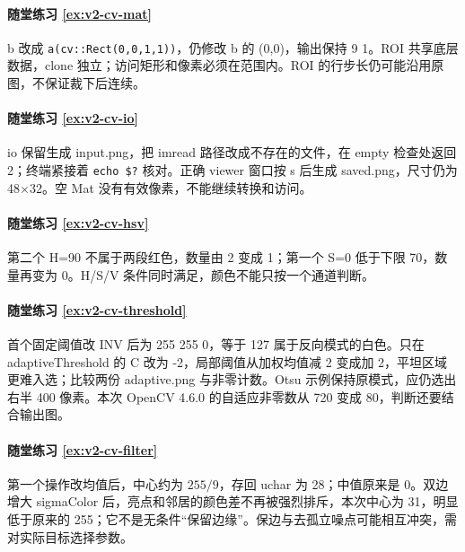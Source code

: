 \paragraph*{随堂练习 \ref{ex:v2-cv-mat}}
\begin{solution}
b 改成 \texttt{a(cv::Rect(0,0,1,1))}，仍修改 b 的 (0,0)，输出保持 9 1。ROI 共享底层数据，clone 独立；访问矩形和像素必须在范围内。ROI 的行步长仍可能沿用原图，不保证裁下后连续。
\end{solution}
\paragraph*{随堂练习 \ref{ex:v2-cv-io}}
\begin{solution}
io 保留生成 input.png，把 imread 路径改成不存在的文件，在 empty 检查处返回 2；终端紧接着 \texttt{echo \$?} 核对。正确 viewer 窗口按 s 后生成 saved.png，尺寸仍为 48×32。空 Mat 没有有效像素，不能继续转换和访问。
\end{solution}
\paragraph*{随堂练习 \ref{ex:v2-cv-hsv}}
\begin{solution}
第二个 H=90 不属于两段红色，数量由 2 变成 1；第一个 S=0 低于下限 70，数量再变为 0。H/S/V 条件同时满足，颜色不能只按一个通道判断。
\end{solution}
\paragraph*{随堂练习 \ref{ex:v2-cv-threshold}}
\begin{solution}
首个固定阈值改 INV 后为 255 255 0，等于 127 属于反向模式的白色。只在 adaptiveThreshold 的 C 改为 -2，局部阈值从加权均值减 2 变成加 2，平坦区域更难入选；比较两份 adaptive.png 与非零计数。Otsu 示例保持原模式，应仍选出右半 400 像素。本次 OpenCV 4.6.0 的自适应非零数从 720 变成 80，判断还要结合输出图。
\end{solution}
\paragraph*{随堂练习 \ref{ex:v2-cv-filter}}
\begin{solution}
第一个操作改均值后，中心约为 $255/9$，存回 uchar 为 28；中值原来是 0。双边增大 sigmaColor 后，亮点和邻居的颜色差不再被强烈排斥，本次中心为 31，明显低于原来的 255；它不是无条件“保留边缘”。保边与去孤立噪点可能相互冲突，需对实际目标选择参数。
\end{solution}
